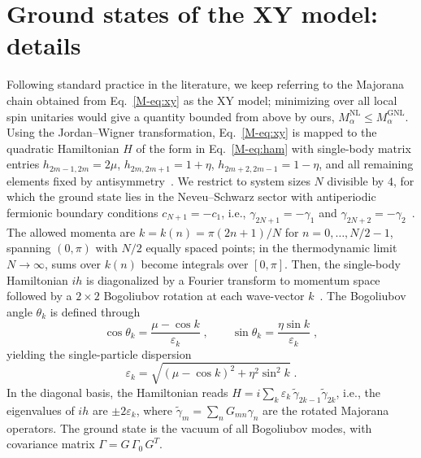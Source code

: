 \documentclass[aps,prl,twocolumn,superscriptaddress,reprint,longbibliography,nofootinbib]{revtex4-2}
\newcommand{\RENYI}{\alpha}
\begin{document}
\section{Ground states of the XY model: details}
\label{app:xy}
Following standard practice in the literature, we keep referring to the Majorana chain obtained from Eq.~\eqref{M-eq:xy} as the XY model; minimizing over all local spin unitaries would give a quantity bounded from above by ours, $M_\RENYI^{\mathrm{NL}}\le M_\RENYI^{\mathrm{GNL}}$.
Using the Jordan--Wigner transformation, Eq.~\eqref{M-eq:xy} is mapped to the quadratic Hamiltonian $H$ of the form in Eq.~\eqref{M-eq:ham} with single-body matrix entries $h_{2m-1,2m} = 2\mu$, $h_{2m,2m+1} = 1+\eta$, $h_{2m+2,2m-1} = 1-\eta$, and all remaining elements fixed by antisymmetry~\cite{Mbeng2024}.
We restrict to system sizes $N$ divisible by $4$, for which the ground state lies in the Neveu--Schwarz sector with antiperiodic fermionic boundary
conditions $c_{N+1}=-c_1$, i.e., $\gamma_{2N+1}=-\gamma_1$ and $\gamma_{2N+2}=-\gamma_2$~\cite{Mbeng2024}.
The allowed momenta are 
$k=k(n)= \pi(2n+1)/N$ for $n = 0,\dots, N/2-1$, 
spanning $(0,\pi)$ with $N/2$ equally spaced points; 
in the thermodynamic limit $N\to\infty$, sums over $k(n)$ 
become integrals over $[0,\pi]$.
Then, the single-body Hamiltonian $ih$ is diagonalized by a Fourier transform to momentum space followed by a $2\times 2$ Bogoliubov rotation at each wave-vector $k$~\cite{Mbeng2024}.
The Bogoliubov angle $\theta_k$ is defined through
\begin{equation}
    \cos\theta_k = \frac{\mu - \cos k}{\varepsilon_k}\;,\qquad \sin\theta_k = \frac{\eta\sin k}{\varepsilon_k}\;,
    \label{eq:bogoliubov_angle}
\end{equation}
yielding the single-particle dispersion
\begin{equation}
    \varepsilon_k = \sqrt{(\mu-\cos k)^2 + \eta^2\sin^2 k}\;.
    \label{eq:dispersion}
\end{equation}
In the diagonal basis, the Hamiltonian reads $H = i\sum_k \varepsilon_k\,\tilde\gamma_{2k-1}\tilde\gamma_{2k}$, i.e., the eigenvalues of $ih$ are $\pm2\varepsilon_k$, where $\tilde\gamma_m = \sum_n G_{mn}\gamma_n$ are the rotated Majorana operators.
The ground state is the vacuum of all Bogoliubov modes, with covariance matrix $\Gamma = G\,\Gamma_0\, G^T$.
\end{document}
